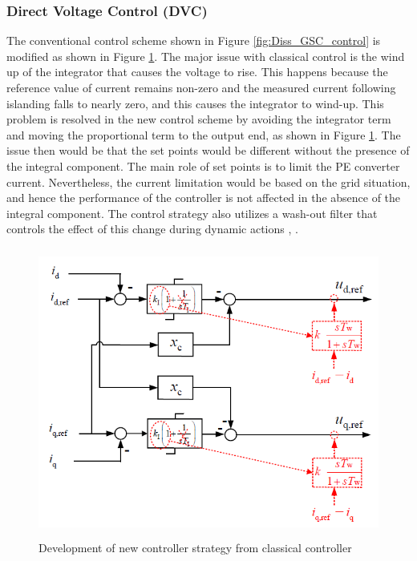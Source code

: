 \subsubsection{Direct Voltage Control (DVC)}\label{DVC_theory}
The conventional control scheme shown in Figure \ref{fig:Diss_GSC_control} is modified as shown in Figure \ref{fig:Diss_DVC_control}. The major issue with classical control is the wind up of the integrator that causes the voltage to rise. This happens because the reference value of current remains non-zero and the measured current following islanding falls to nearly zero, and this causes the integrator to wind-up. This problem is resolved in the new control scheme by avoiding the integrator term and moving the proportional term to the output end, as shown in Figure \ref{fig:Diss_DVC_control}. The issue then would be that the set points would be different without the presence of the integral component. The main role of set points is to limit the \gls{PE} converter current. Nevertheless, the current limitation would be based on the grid situation, and hence the performance of the controller is not affected in the absence of the integral component. The control strategy also utilizes a wash-out filter that controls the effect of this change during dynamic actions \cite{erlich_new_2017}, \cite{korai_dynamic_2019}.         
\begin{figure}[H]
\centering
    \includegraphics[height = 9.5cm,width = 11.5cm]{Diagrams/Chapter_2/Diss_DVC_control.PNG}
    \caption{ Development of new controller strategy from classical controller \cite{erlich_new_2017}}
    \label{fig:Diss_DVC_control}
\end{figure}

